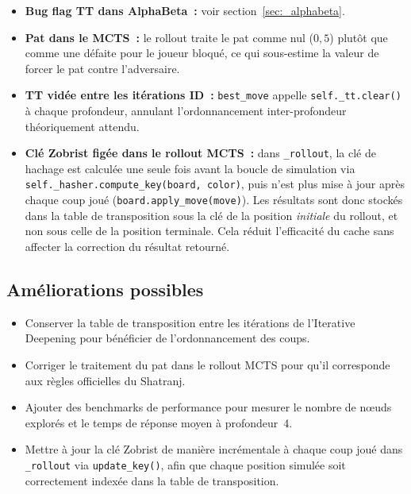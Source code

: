 \documentclass[a4paper,11pt]{article}
\begin{document}
\begin{itemize}[noitemsep]
  \item \textbf{Bug flag TT dans AlphaBeta~:} voir section~\ref{sec:_alphabeta}.
  \item \textbf{Pat dans le MCTS~:} le rollout traite le pat comme nul ($0{,}5$)
    plutôt que comme une défaite pour le joueur bloqué, ce qui sous-estime
    la valeur de forcer le pat contre l'adversaire.
  \item \textbf{TT vidée entre les itérations ID~:} \texttt{best\_move} appelle
    \texttt{self.\_tt.clear()} à chaque profondeur, annulant l'ordonnancement
    inter-profondeur théoriquement attendu.
    \item \textbf{Clé Zobrist figée dans le rollout MCTS~:}
    dans \texttt{\_rollout}, la clé de hachage est calculée une seule fois
    avant la boucle de simulation via
    \texttt{self.\_hasher.compute\_key(board, color)},
    puis n'est plus mise à jour après chaque coup joué
    (\texttt{board.apply\_move(move)}).
    Les résultats sont donc stockés dans la table de transposition
    sous la clé de la position \emph{initiale} du rollout,
    et non sous celle de la position terminale.
    Cela réduit l'efficacité du cache sans affecter la correction
    du résultat retourné.
\end{itemize}

\subsection{Améliorations possibles}

\begin{itemize}[noitemsep]
  \item Conserver la table de transposition entre les itérations de
    l'Iterative Deepening pour bénéficier de l'ordonnancement des coups.
  \item Corriger le traitement du pat dans le rollout MCTS pour qu'il
    corresponde aux règles officielles du Shatranj.
  \item Ajouter des benchmarks de performance pour mesurer le nombre de
    nœuds explorés et le temps de réponse moyen à profondeur~4.
    \item Mettre à jour la clé Zobrist de manière incrémentale à chaque coup
    joué dans \texttt{\_rollout} via \texttt{update\_key()},
    afin que chaque position simulée soit correctement indexée
    dans la table de transposition.
\end{itemize}



\end{document}
